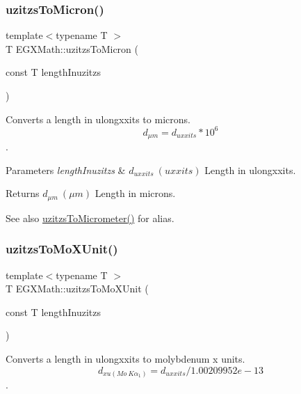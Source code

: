 \subsubsection{\texorpdfstring{uzitzs\+To\+Micron()}{uzitzsToMicron()}}
{\footnotesize\ttfamily template$<$typename T $>$ \\
T E\+G\+X\+Math\+::uzitzs\+To\+Micron (\begin{DoxyParamCaption}\item[{const T}]{length\+Inuzitzs }\end{DoxyParamCaption})}



Converts a length in ulongxxits to microns. \[ d_{\mu m}=d_{uxxits} * 10^{6} \]. 


\begin{DoxyParams}{Parameters}
{\em length\+Inuzitzs} & $ d_{uxxits}\ (uxxits)$ Length in ulongxxits. \\
\hline
\end{DoxyParams}
\begin{DoxyReturn}{Returns}
$ d_{\mu m}\ (\mu m)$ Length in microns. 
\end{DoxyReturn}
\begin{DoxySeeAlso}{See also}
\mbox{\hyperlink{group___e_g_x_math-_conversions-_length_conversions-uzitzs-_s_i_ga0bd484a80b8b66cd5272bbbc1fe6b642}{uzitzs\+To\+Micrometer()}} for alias. 
\end{DoxySeeAlso}
\mbox{\label{group___e_g_x_math-_conversions-_length_conversions-uzitzs-_non-_s_i_ga64b556911b0bb06cf315aa02f5e2d379}} 
\subsubsection{\texorpdfstring{uzitzs\+To\+Mo\+X\+Unit()}{uzitzsToMoXUnit()}}
{\footnotesize\ttfamily template$<$typename T $>$ \\
T E\+G\+X\+Math\+::uzitzs\+To\+Mo\+X\+Unit (\begin{DoxyParamCaption}\item[{const T}]{length\+Inuzitzs }\end{DoxyParamCaption})}



Converts a length in ulongxxits to molybdenum x units. \[ d_{xu(Mo\ K\alpha_1)}=d_{uxxits} / 1.00209952e-13 \]. 


